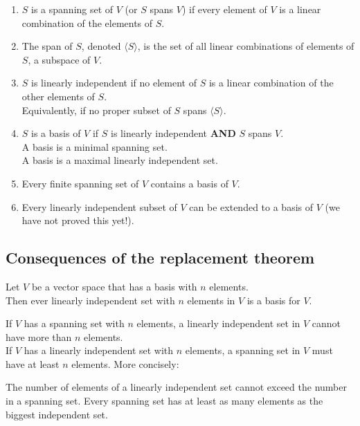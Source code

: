 \documentclass[a4paper, 9pt]{extarticle}
\begin{document}
\begin{enumerate}
  \item $S$ is a spanning set of $V$ (or $S$ spans $V$) if every element of $V$ is a linear combination of the elements of $S$.

  \item The span of $S$, denoted $\langle S \rangle$, is the set of all linear combinations of elements of $S$, a subspace of $V$.

  \item $S$ is linearly independent if no element of $S$ is a linear combination of the other elements of $S$.\\
        Equivalently, if no proper subset of $S$ spans $\langle S \rangle$.

  \item $S$ is a basis of $V$ if $S$ is linearly independent \textbf{AND} $S$ spans $V$.\\
        A basis is a minimal spanning set.\\
        A basis is a maximal linearly independent set.

  \item Every finite spanning set of $V$ contains a basis of $V$.

  \item Every linearly independent subset of $V$ can be extended to a basis of $V$ (we have not proved this yet!).
\end{enumerate}

\subsection{Consequences of the replacement theorem}
\begin{theorembox}{}{}
  Let $V$ be a vector space that has a basis with $n$ elements. \\[2ex]
  Then ever linearly independent set with $n$ elements in $V$ is a basis for $V$.
\end{theorembox}
If $V$ has a spanning set with $n$ elements, a linearly independent set in $V$ cannot have more than $n$ elements. \\[2ex]
If $V$ has a linearly independent set with $n$ elements, a spanning set in $V$ must have at least $n$ elements. More concisely:
\begin{conceptbox}{}{}
  The number of elements of a linearly independent set cannot exceed the number in a spanning set. Every spanning set has at least as many elements as the biggest independent set.
\end{conceptbox}
\end{document}
